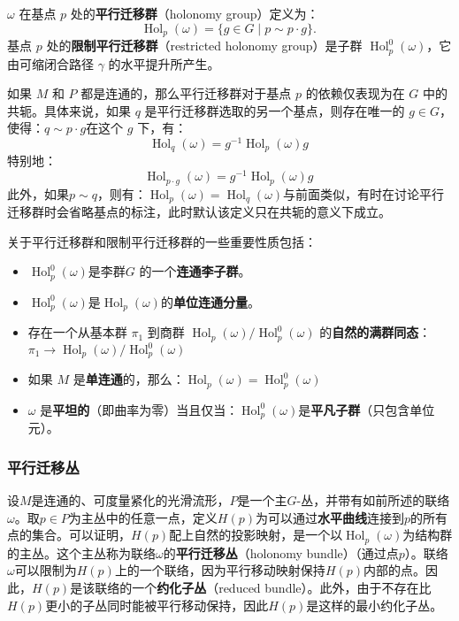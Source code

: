 \(\omega\) 在基点 \(p\) 处的\textbf{平行迁移群}（holonomy group）定义为：
\[
\operatorname{Hol}_p(\omega) = \{g \in G \mid p \sim p \cdot g\}.~
\]
基点 \(p\) 处的\textbf{限制平行迁移群}（restricted holonomy group）是子群 \(\operatorname{Hol}_p^0(\omega)\)，它由可缩闭合路径 \(\gamma\) 的水平提升所产生。

如果 \(M\) 和 \(P\) 都是连通的，那么平行迁移群对于基点 \(p\) 的依赖仅表现为在 \(G\) 中的共轭。具体来说，如果 \(q\) 是平行迁移群选取的另一个基点，则存在唯一的 \(g \in G\)，使得：\(q \sim p \cdot g\)在这个 \(g\) 下，有：
\[
\operatorname{Hol}_q(\omega) = g^{-1}\operatorname{Hol}_p(\omega)g~
\]
特别地：
\[
\operatorname{Hol}_{p \cdot g}(\omega) = g^{-1}\operatorname{Hol}_p(\omega)g~
\]
此外，如果\(p \sim q\)，则有：\(\operatorname{Hol}_p(\omega)=\operatorname{Hol}_q(\omega)\)与前面类似，有时在讨论平行迁移群时会省略基点的标注，此时默认该定义只在共轭的意义下成立。

关于平行迁移群和限制平行迁移群的一些重要性质包括：
\begin{itemize}
\item \(\operatorname{Hol}_p^0(\omega)\)是李群\(G\) 的一个\textbf{连通李子群}。
\item \(\operatorname{Hol}_p^0(\omega)\)是\(\operatorname{Hol}_p(\omega)\)的\textbf{单位连通分量}。
\item 存在一个从基本群 \(\pi_1\) 到商群 \(\operatorname{Hol}_p(\omega)/\operatorname{Hol}_p^0(\omega)\) 的\textbf{自然的满群同态}：\(\pi_1 \to \operatorname{Hol}_p(\omega)/\operatorname{Hol}_p^0(\omega)\)
\item 如果 \(M\) 是\textbf{单连通}的，那么：\(\operatorname{Hol}_p(\omega) = \operatorname{Hol}_p^0(\omega)\)
\item \(\omega\) 是\textbf{平坦的}（即曲率为零）当且仅当：\(\operatorname{Hol}_p^0(\omega)\)是\textbf{平凡子群}（只包含单位元）。
\end{itemize}
\subsubsection{平行迁移丛}  
设\(M\)是连通的、可度量紧化的光滑流形，\(P\)是一个主\(G\)-丛，并带有如前所述的联络\(\omega\)。取\(p \in P\)为主丛中的任意一点，定义\(H(p)\)为可以通过\textbf{水平曲线}连接到\(p\)的所有点的集合。可以证明，\(H(p)\)配上自然的投影映射，是一个以\(\operatorname{Hol}_p(\omega)\)为结构群的主丛。这个主丛称为联络\(\omega\)的\textbf{平行迁移丛}（holonomy bundle）（通过点\(p\)）。联络\(\omega\)可以限制为\(H(p)\)上的一个联络，因为平行移动映射保持\(H(p)\)内部的点。因此，\(H(p)\)是该联络的一个\textbf{约化子丛}（reduced bundle）。此外，由于不存在比\(H(p)\)更小的子丛同时能被平行移动保持，因此\(H(p)\)是这样的最小约化子丛。

